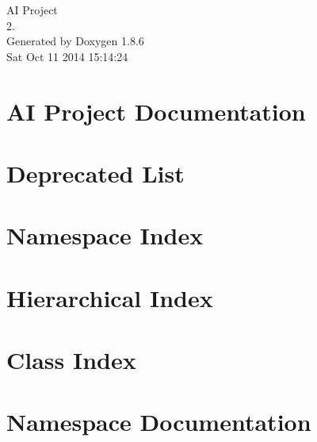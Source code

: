 \documentclass[twoside]{book}
\newcommand{\clearemptydoublepage}{%
  \newpage{\pagestyle{empty}\cleardoublepage}%
}
\begin{document}
\hypersetup{pageanchor=false}
\begin{titlepage}
\vspace*{7cm}
\begin{center}%
{\Large A\-I Project \\[1ex]\large 2. }\\
\vspace*{1cm}
{\large Generated by Doxygen 1.8.6}\\
\vspace*{0.5cm}
{\small Sat Oct 11 2014 15:14:24}\\
\end{center}
\end{titlepage}
\clearemptydoublepage
\tableofcontents
\clearemptydoublepage
{}
\hypersetup{pageanchor=true}

\chapter{A\-I Project Documentation}
\label{index}\hypertarget{index}{}
\chapter{Deprecated List}
\label{deprecated}
\hypertarget{deprecated}{}

\chapter{Namespace Index}

\chapter{Hierarchical Index}

\chapter{Class Index}

\chapter{Namespace Documentation}

\end{document}
